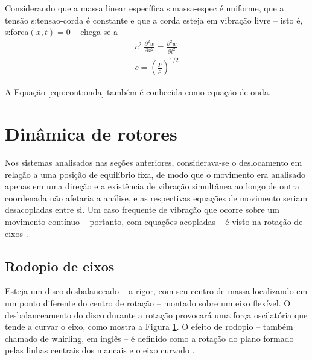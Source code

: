 \documentclass[12pt,oneside,english,brazil,lmodern,siglas,simbolos,cite=num]{ucsmonograph}
\begin{document}
	Considerando que a massa linear específica \gls{s:massa-espec} é uniforme, que a tensão \gls{s:tensao-corda} é constante e que a corda esteja em vibração livre -- isto é, \gls{s:forca}$(x,t) = 0$ -- chega-se a \cite{rao:2008}
	\begin{align}
		\mathit{c}^2\:\frac{\partial^2 w}{\partial x^2}=\frac{\partial^2 w}{\partial t^2} \label{eqn:cont:onda}\\
		\mathit{c} = \left(\frac{P}{\rho}\right)^{1/2}
	\end{align}
	
	A Equação \ref{eqn:cont:onda} também é conhecida como equação de onda. 
	
	\section{Dinâmica de rotores}
	Nos sistemas analisados nas seções anteriores, considerava-se o deslocamento em relação a uma posição de equilíbrio fixa, de modo que o movimento era analisado apenas em uma direção e a existência de vibração simultânea ao longo de outra coordenada não afetaria a análise, e as respectivas equações de movimento seriam desacopladas entre si.
	Um caso frequente de vibração que ocorre sobre um movimento contínuo -- portanto, com equações acopladas -- é visto na rotação de eixos \cite{dimarogonas:1995}.

	\subsection{Rodopio de eixos}
	Esteja um disco desbalanceado -- a rigor, com seu centro de massa localizando em um ponto diferente do centro de rotação -- montado sobre um eixo flexível.
	O desbalanceamento do disco durante a rotação provocará uma força oscilatória que tende a curvar o eixo, como mostra a Figura \ref{fig:whirl-eixo}.
	O efeito de rodopio -- também chamado de \foreignlanguage{english}{whirling}, em inglês -- é definido como a rotação do plano formado pelas linhas centrais dos mancais e o eixo curvado \cite{rao:2008}.
	\begin{figure}[b]
		\label{fig:whirl-eixo}
	\end{figure}
\end{document}
